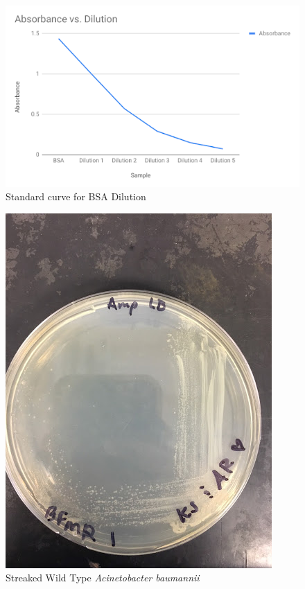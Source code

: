 \documentclass[11pt]{article}
\begin{document}
\begin{figure}[htbp]
\centering
\includegraphics[scale=0.65]{bsa-dilution-curve.png}
\caption{Standard curve for BSA Dilution}
\label{fig:dilution-curve}
\end{figure}


\begin{figure}[htbp]
\centering
\includegraphics[scale=0.5]{streaked-bacteria.jpg}
\caption{Streaked Wild Type \emph{Acinetobacter baumannii}}
\label{fig:streaked-bacteria}
\end{figure}
\end{document}
